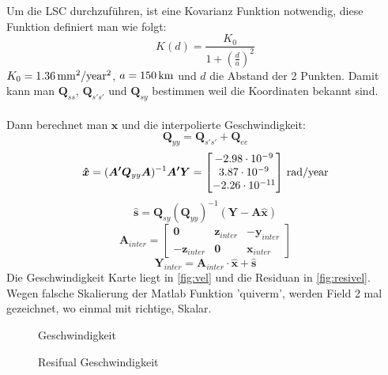 Um die LSC durchzuführen, ist eine Kovarianz Funktion notwendig, diese Funktion definiert man wie folgt:
\begin{equation*}
	K(d) = \frac{K_0}{1 + (\frac{d}{a})^2}
\end{equation*}
$K_0 = 1.36\,\mathrm{mm^2/year^2}$, $a = 150 \,\mathrm{km}$ und $d$ die Abstand der 2 Punkten. Damit kann man $\bm{Q}_{ss}$,  $\bm{Q}_{s's'}$ und $\bm{Q}_{sy}$ bestimmen weil die Koordinaten bekannt sind. \\\\
Dann berechnet man $\bm{x}$ und die interpolierte Geschwindigkeit:
\begin{equation*}
	\bm{Q}_{yy} = \bm{Q}_{s's'} + \bm{Q}_{ee}
\end{equation*}
\begin{equation*}
	\bm{\hat{x}} = (\bm{A'}\bm{Q}_{yy}\bm{A})^{-1}\bm{A'}\bm{Y} = \begin{bmatrix}
		-2.98 \cdot 10^{-9} \\
		3.87 \cdot 10^{-9} \\
		-2.26 \cdot 10^{-11}
	\end{bmatrix} \,\mathrm{rad/year}
\end{equation*} 
\begin{equation*}
	\bm{\hat{s}} = \bm{Q}_{sy} (\bm{Q}_{yy})^{-1} (\bm{Y} - \bm{A}\bm{\hat{x}})
\end{equation*}
\begin{equation*}
	\bm{A}_{inter} = \begin{bmatrix}
		\bm{0} & \bm{z}_{inter} & -\bm{y}_{inter} \\
		-\bm{z}_{inter} & \bm{0} & \bm{x}_{inter} 
	\end{bmatrix} 
\end{equation*}
\begin{equation*}
	\bm{Y}_{inter} = \bm{A}_{inter} \cdot \bm{\hat{x}} + \bm{\hat{s}}
\end{equation*}
Die Geschwindigkeit Karte liegt in \autoref{fig:vel} und die Residuan in \autoref{fig:resivel}. Wegen falsche Skalierung der Matlab Funktion 'quiverm', werden Field 2 mal gezeichnet, wo einmal mit richtige, Skalar.
\begin{figure}[htpb]\centering
	\caption{Geschwindigkeit}
	\label{fig:vel}
\end{figure}
\begin{figure}[htpb]\centering
	\caption{Resifual Geschwindigkeit}
	\label{fig:resivel}
\end{figure}\\\\
